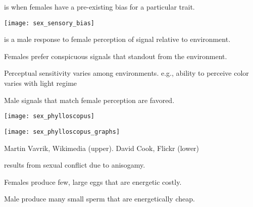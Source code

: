 \documentclass[t]{beamer}
\newcommand{\backskip}{\vspace{-0.5\baselineskip}}
\begin{document}

\begin{frame}{ is when females have a pre-existing bias for a particular trait.}

\backskip

\texttt{[image: sex\_sensory\_bias]}

\end{frame}


\begin{frame}{ is a male response to female perception of signal relative to environment.}

\hangpara Females prefer conspicuous signals that standout from the environment.

\hangpara Perceptual sensitivity varies among environments.
e.g., ability to perceive color varies with light regime

\hangpara Male signals that match female perception are favored.

\end{frame}


\begin{frame}
\begin{multicols}{2}

\texttt{[image: sex\_phylloscopus]}

\columnbreak

\texttt{[image: sex\_phylloscopus\_graphs]}

\end{multicols}



\vfilll

\tiny Martin Vavrik, Wikimedia (upper). David Cook, Flickr (lower)
\end{frame}




\begin{frame}{ results from sexual conflict due to anisogamy.}

\hangpara Females produce few, large eggs that are energetic costly.

\hangpara Male produce many small sperm that are energetically cheap.

\end{frame}
\end{document}
